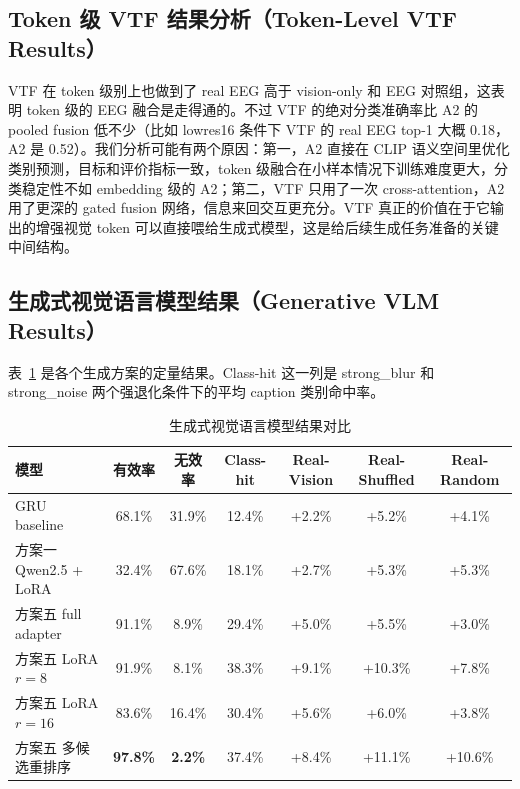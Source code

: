 \subsection{Token 级 VTF 结果分析（Token-Level VTF Results）}

VTF 在 token 级别上也做到了 real EEG 高于 vision-only 和 EEG 对照组，这表明 token 级的 EEG 融合是走得通的。不过 VTF 的绝对分类准确率比 A2 的 pooled fusion 低不少（比如 lowres16 条件下 VTF 的 real EEG top-1 大概 0.18，A2 是 0.52）。我们分析可能有两个原因：第一，A2 直接在 CLIP 语义空间里优化类别预测，目标和评价指标一致，token 级融合在小样本情况下训练难度更大，分类稳定性不如 embedding 级的 A2；第二，VTF 只用了一次 cross-attention，A2 用了更深的 gated fusion 网络，信息来回交互更充分。VTF 真正的价值在于它输出的增强视觉 token 可以直接喂给生成式模型，这是给后续生成任务准备的关键中间结构。

\subsection{生成式视觉语言模型结果（Generative VLM Results）}

表~\ref{tab:evlm-results} 是各个生成方案的定量结果。Class-hit 这一列是 strong\_blur 和 strong\_noise 两个强退化条件下的平均 caption 类别命中率。

\begin{table}[htbp]
  \centering
  \caption{生成式视觉语言模型结果对比}
  \label{tab:evlm-results}
  \begin{tabular}{l c c c c c c}
    \toprule
    模型 & 有效率 & 无效率 & Class-hit & Real-Vision & Real-Shuffled & Real-Random \\
    \midrule
    GRU baseline & 68.1\% & 31.9\% & 12.4\% & +2.2\% & +5.2\% & +4.1\% \\
    方案一 Qwen2.5 + LoRA & 32.4\% & 67.6\% & 18.1\% & +2.7\% & +5.3\% & +5.3\% \\
    方案五 full adapter & 91.1\% & 8.9\% & 29.4\% & +5.0\% & +5.5\% & +3.0\% \\
    方案五 LoRA $r=8$ & 91.9\% & 8.1\% & 38.3\% & +9.1\% & +10.3\% & +7.8\% \\
    方案五 LoRA $r=16$ & 83.6\% & 16.4\% & 30.4\% & +5.6\% & +6.0\% & +3.8\% \\
    方案五 多候选重排序 & \textbf{97.8\%} & \textbf{2.2\%} & 37.4\% & +8.4\% & +11.1\% & +10.6\% \\
    \bottomrule
  \end{tabular}
\end{table}

